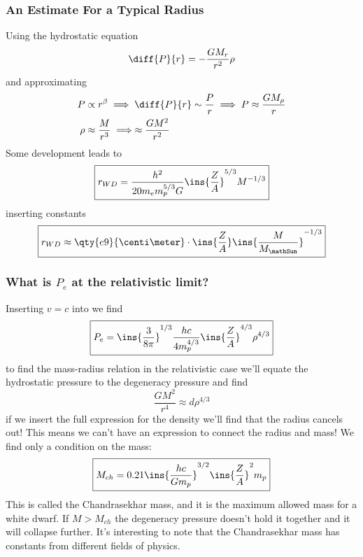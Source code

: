 \subsubsection{An Estimate For a Typical Radius}
Using the hydrostatic equation
\begin{equation}
    \diff{P}{r} = -\frac{GM_r}{r^2}\rho
\end{equation}
and approximating
\begin{align}
    P &\propto r^\beta \implies \diff{P}{r} \sim \frac{P}{r} \implies P\approx \frac{GM_\rho}{r} \\
    \rho &\approx \frac{M}{r^3} \implies \approx\frac{GM^2}{r^2}
\end{align}
Some development leads to
\begin{equation}
    \boxed{r_{WD} = \frac{h^2}{20 m_e m_p^{5/3}G}\ins{\frac{Z}{A}}^{5/3}M^{-1/3}}
\end{equation}
inserting constants
\begin{equation}
    \boxed{r_{WD} \approx \qty{e9}{\centi\meter} \cdot \ins{\frac{Z}{A}}\ins{\frac{M}{M_\mathSun}}^{-1/3}} 
\end{equation}
\subsubsection{What is \(P_e\) at the relativistic limit?}
Inserting \(v=c\) into  we find
\begin{equation}
    \boxed{P_e = \ins{\frac{3}{8\pi}}^{1/3}\frac{hc}{4m_p^{4/3}}\ins{\frac{Z}{A}}^{4/3}\rho^{4/3}}
\end{equation}
to find the mass-radius relation in the relativistic case we'll equate the hydrostatic pressure to the degeneracy pressure and find
\begin{equation}
    \frac{GM^2}{r^4} \approx d\rho^{4/3}
\end{equation}
if we insert the full expression for the density we'll find that the radius cancels out! This means we can't have an expression to connect the radius and mass! We find only a condition on the mass:
\begin{equation}
    \boxed{M_{ch} = 0.21 \ins{\frac{hc}{Gm_p}}^{3/2}\ins{\frac{Z}{A}}^2 m_p}
\end{equation}
This is called the Chandrasekhar mass, and it is the maximum allowed mass for a white dwarf. If \(M>M_{ch}\) the degeneracy pressure doesn't hold it together and it will collapse further. It's interesting to note that the Chandrasekhar mass has constants from different fields of physics.
